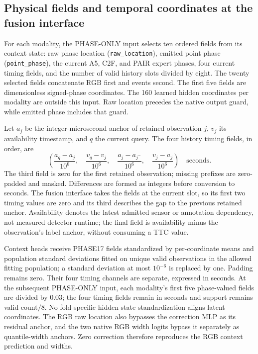 \subsection{Physical fields and temporal coordinates at the fusion interface}
\label{sec:physical-fusion-fields}
For each modality, the PHASE-ONLY input selects ten ordered fields from its context state: raw phase location (\texttt{raw\_location}), emitted point phase (\texttt{point\_phase}), the current A5, C2F, and PAIR expert phases, four current timing fields, and the number of valid history slots divided by eight. The twenty selected fields concatenate RGB first and events second. The first five fields are dimensionless signed-phase coordinates. The 160 learned hidden coordinates per modality are outside this input. Raw location precedes the native output guard, while emitted phase includes that guard. 

Let $a_j$ be the integer-microsecond anchor of retained observation $j$, $v_j$ its availability timestamp, and $q$ the current query. The four history timing fields, in order, are
\begin{equation}
 \left(\frac{a_q-a_j}{10^6},\quad
       \frac{v_q-v_j}{10^6},\quad
       \frac{a_j-a_{j^-}}{10^6},\quad
       \frac{v_j-a_j}{10^6}\right)\quad\mathrm{seconds}.
\end{equation}
The third field is zero for the first retained observation; missing prefixes are zero-padded and masked. Differences are formed as integers before conversion to seconds. The fusion interface takes the fields at the current slot, so its first two timing values are zero and its third describes the gap to the previous retained anchor. Availability denotes the latest admitted sensor or annotation dependency, not measured detector runtime; the final field is availability minus the observation's label anchor, without consuming a TTC value. 

Context heads receive PHASE17 fields standardized by per-coordinate means and population standard deviations fitted on unique valid observations in the allowed fitting population; a standard deviation at most $10^{-6}$ is replaced by one. Padding remains zero. Their four timing channels are separate, expressed in seconds. At the subsequent PHASE-ONLY input, each modality's first five phase-valued fields are divided by $0.03$; the four timing fields remain in seconds and support remains valid-count$/8$. No fold-specific hidden-state standardization aligns latent coordinates. The RGB raw location also bypasses the correction MLP as its residual anchor, and the two native RGB width logits bypass it separately as quantile-width anchors. Zero correction therefore reproduces the RGB context prediction and widths. 

